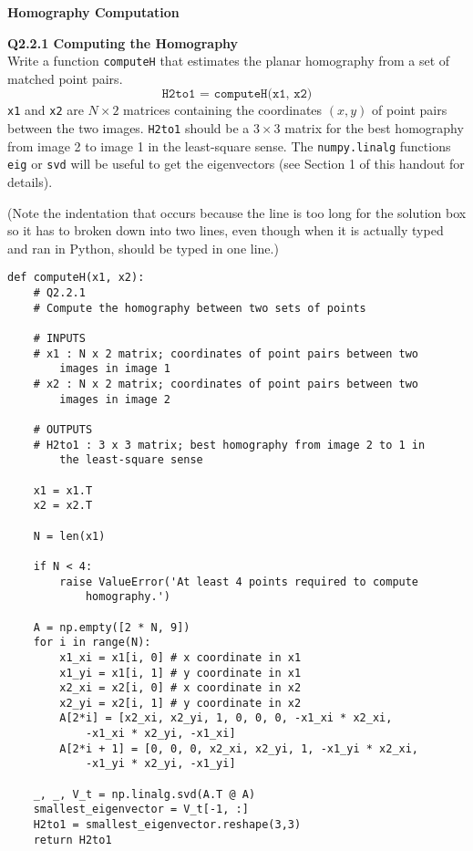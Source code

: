 \documentclass[12pt,letterpaper, onecolumn]{exam}
\begin{document}
\begin{questions}
    \pagebreak
    
    \begingroup
    \large \textbf{Homography Computation}
    \endgroup
    
    \question \textbf{Q2.2.1 Computing the Homography}\\
    Write a function \texttt{computeH} that estimates the planar homography from a set of matched point pairs.
    \[
        \texttt{H2to1 = computeH(x1, x2)}
    \]
    \texttt{x1} and \texttt{x2} are $N \times 2$ matrices containing the coordinates $(x, y)$ of point pairs between the two images. \texttt{H2to1} should be a $3 \times 3$ matrix for the best homography from image 2 to image 1 in the least-square sense. The \texttt{numpy.linalg} functions \texttt{eig} or \texttt{svd} will be useful to get the eigenvectors (see Section 1 of this handout for details).

    \begin{solution}
    (Note the indentation that occurs because the line is too long for the solution box so it has to broken down into two lines, even though when it is actually typed and ran in Python, should be typed in one line.)
        \begin{verbatim}
def computeH(x1, x2):
    # Q2.2.1
    # Compute the homography between two sets of points
    
    # INPUTS
    # x1 : N x 2 matrix; coordinates of point pairs between two
        images in image 1
    # x2 : N x 2 matrix; coordinates of point pairs between two
        images in image 2
    
    # OUTPUTS
    # H2to1 : 3 x 3 matrix; best homography from image 2 to 1 in
        the least-square sense
    
    x1 = x1.T
    x2 = x2.T
    
    N = len(x1)
    
    if N < 4:
        raise ValueError('At least 4 points required to compute
            homography.')
    
    A = np.empty([2 * N, 9])
    for i in range(N):
        x1_xi = x1[i, 0] # x coordinate in x1
        x1_yi = x1[i, 1] # y coordinate in x1
        x2_xi = x2[i, 0] # x coordinate in x2
        x2_yi = x2[i, 1] # y coordinate in x2
        A[2*i] = [x2_xi, x2_yi, 1, 0, 0, 0, -x1_xi * x2_xi,
            -x1_xi * x2_yi, -x1_xi]
        A[2*i + 1] = [0, 0, 0, x2_xi, x2_yi, 1, -x1_yi * x2_xi,
            -x1_yi * x2_yi, -x1_yi]
    
    _, _, V_t = np.linalg.svd(A.T @ A)
    smallest_eigenvector = V_t[-1, :]
    H2to1 = smallest_eigenvector.reshape(3,3)
    return H2to1
        \end{verbatim}
    \end{solution}


\end{questions}
\end{document}
